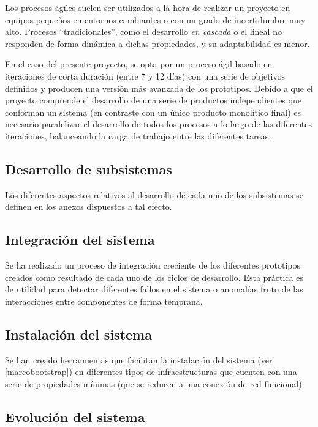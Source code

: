 Los procesos ágiles suelen ser utilizados a la hora de realizar un proyecto en equipos pequeños en entornos cambiantes o con un grado de incertidumbre muy alto. Procesos ``tradicionales'', como el desarrollo \textit{en cascada} o el lineal no responden de forma dinámica a dichas propiedades, y su adaptabilidad es menor.

En el caso del presente proyecto, se opta por un proceso ágil basado en iteraciones de corta duración (entre 7 y 12 días) con una serie de objetivos definidos y producen una versión más avanzada de los prototipos. Debido a que el proyecto comprende el desarrollo de una serie de productos independientes que conforman un sistema (en contraste con un único producto monolítico final) es necesario paralelizar el desarrollo de todos los procesos a lo largo de las diferentes iteraciones, balanceando la carga de trabajo entre las diferentes tareas.

\subsection{Desarrollo de subsistemas}
Los diferentes aspectos relativos al desarrollo de cada uno de los subsistemas se definen en los anexos dispuestos a tal efecto.

\subsection{Integración del sistema}

Se ha realizado un proceso de integración creciente de los diferentes prototipos creados como resultado de cada uno de los ciclos de desarrollo. Esta práctica es de utilidad para detectar diferentes fallos en el sistema o anomalías fruto de las interacciones entre componentes de forma temprana.

\subsection{Instalación del sistema}

Se han creado herramientas que facilitan la instalación del sistema (ver \ref{marcobootstrap}) en diferentes tipos de infraestructuras que cuenten con una serie de propiedades mínimas (que se reducen a una conexión de red funcional).

\subsection{Evolución del sistema}

